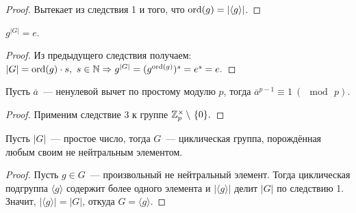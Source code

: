 	\begin{proof}
		Вытекает из следствия 1 и того, что $\mathrm{ord}(g) = |\langle g \rangle|$.
	\end{proof}
	\begin{consequence}
		$g^{|G|} = e$.
	\end{consequence}
	\begin{proof}
		Из предыдущего следствия получаем: ${|G| = \mathrm{ord}(g) \cdot s, \ s \in \mathbb{N}} \Rightarrow g^{|G|} = (g^{\mathrm{ord}(g)})^s = e^s = e.$
	\end{proof}
	\begin{consequence}
		Пусть $\overline{a}$~--- ненулевой вычет по простому модулю $p$, тогда $\overline{a}^{p-1} \equiv 1 \ (\mod \, p).$
	\end{consequence}
	\begin{proof}
		Применим следствие 3 к группе $\integers_p ^ {\times} \, \backslash \ \{0\}.$ \qedhere
	\end{proof}
	\begin{consequence}
		Пусть $|G|$~--- простое число, тогда $G$~--- циклическая группа, порождённая любым своим не нейтральным элементом.
	\end{consequence}
	\begin{proof}
		Пусть $g \in G$~--- произвольный не нейтральный элемент. Тогда циклическая подгруппа $\langle g \rangle$ содержит более одного элемента и $|\langle g \rangle|$ делит $|G|$ по следствию 1. Значит, $|\langle g \rangle| = |G|$, откуда $G = \langle g \rangle$. 
	\end{proof}